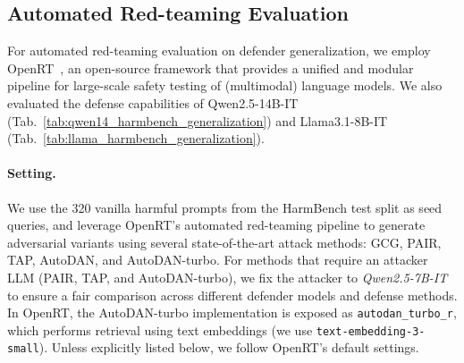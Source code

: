 \documentclass[11pt, letterpaper]{template}
\theoremstyle{plain}
\theoremstyle{definition}
\theoremstyle{remark}
\begin{document}
\subsection{Automated Red-teaming Evaluation}\label{apx:openrt}

For automated red-teaming evaluation on defender generalization, we employ OpenRT~\citep{OpenRT2026}, an open-source framework that provides a unified and modular pipeline for large-scale safety testing of (multimodal) language models. We also evaluated the defense capabilities of Qwen2.5-14B-IT (Tab.~\ref{tab:qwen14_harmbench_generalization}) and Llama3.1-8B-IT (Tab.~\ref{tab:llama_harmbench_generalization}).

\paragraph{Setting.} We use the 320 vanilla harmful prompts from the HarmBench test split as seed queries, and leverage OpenRT's automated red-teaming pipeline to generate adversarial variants using several state-of-the-art attack methods: GCG, PAIR, TAP, AutoDAN, and AutoDAN-turbo. For methods that require an attacker LLM (PAIR, TAP, and AutoDAN-turbo), we fix the attacker to \textit{Qwen2.5-7B-IT} to ensure a fair comparison across different defender models and defense methods. In OpenRT, the AutoDAN-turbo implementation is exposed as \texttt{autodan\_turbo\_r}, which performs retrieval using text embeddings (we use \texttt{text-embedding-3-small}). Unless explicitly listed below, we follow OpenRT's default settings.

\end{document}
